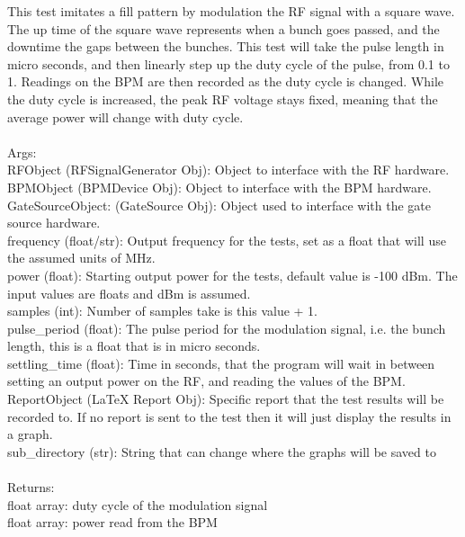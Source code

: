 \documentclass[a4paper, 11pt]{article}%
\begin{document}
        This test imitates a fill pattern by modulation the RF signal with a square wave. The up time 
        of the square wave represents when a bunch goes passed, and the downtime the gaps between the 
        bunches. This test will take the pulse length in micro seconds, and then linearly step up the 
        duty cycle of the pulse, from 0.1 to 1. Readings on the BPM are then recorded as the duty cycle
        is changed. While the duty cycle is increased, the peak RF voltage stays fixed, meaning that 
        the average power will change with duty cycle. \\~\\
        Args:\\
            RFObject (RFSignalGenerator Obj): Object to interface with the RF hardware.\\
            BPMObject (BPMDevice Obj): Object to interface with the BPM hardware.\\
            GateSourceObject: (GateSource Obj): Object used to interface with the gate source hardware. \\
            frequency (float/str): Output frequency for the tests, set as a float that will use the assumed units of MHz. \\
            power (float): Starting output power for the tests, default value is -100 dBm. The input values are floats and dBm is assumed. \\
            samples (int): Number of samples take is this value + 1.\\
            pulse\_period (float): The pulse period for the modulation signal, i.e. the bunch length, this is a float that is in micro seconds.\\
            settling\_time (float): Time in seconds, that the program will wait in between setting an  output power on the RF, and reading the values of the BPM. \\
            ReportObject (LaTeX Report Obj): Specific report that the test results will be recorded to. If no report is sent to the test then it will just display the results in a graph. \\
            sub\_directory (str): String that can change where the graphs will be saved to\\~\\  
        Returns:\\
            float array: duty cycle of the modulation signal\\
            float array: power read from the BPM\\
\end{document}
